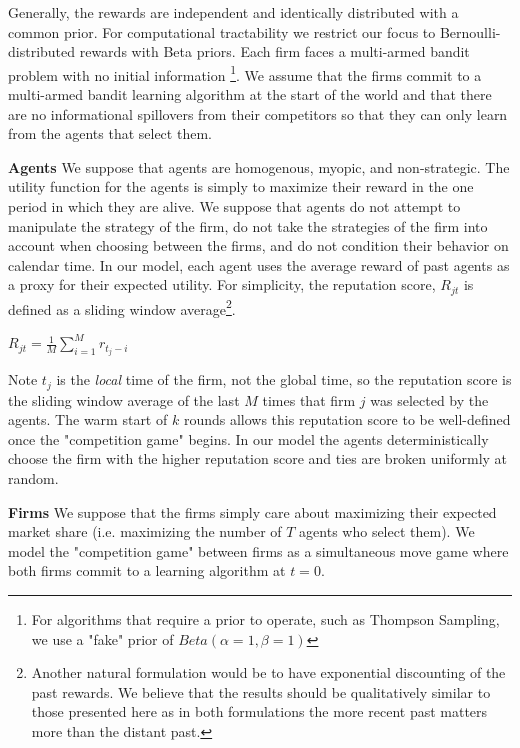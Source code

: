\documentclass[letterpaper]{article}
\theoremstyle{definition}
\begin{document}
Generally, the rewards are independent and identically distributed with a common prior.  For computational tractability we restrict our focus to Bernoulli-distributed rewards with Beta priors. Each firm faces a multi-armed bandit problem with no initial information \footnote{For algorithms that require a prior to operate, such as Thompson Sampling, we use a "fake" prior of $Beta(\alpha=1,\beta=1)$}. We assume that the firms commit to a multi-armed bandit learning algorithm at the start of the world and that there are no informational spillovers from their competitors so that they can only learn from the agents that select them.

\noindent \textbf{Agents} We suppose that agents are homogenous, myopic, and non-strategic. The utility function for the agents is simply to maximize their reward in the one period in which they are alive. We suppose that agents do not attempt to manipulate the strategy of the firm, do not take the strategies of the firm into account when choosing between the firms, and do not condition their behavior on calendar time. In our model, each agent uses the average reward of past agents as a proxy for their expected utility. For simplicity, the reputation score, $R_{jt}$ is defined as a sliding window average\footnote{Another natural formulation would be to have exponential discounting of the past rewards. We believe that the results should be qualitatively similar to those presented here as in both formulations the more recent past matters more than the distant past.}.
\begin{center}
$R_{jt} = \frac{1}{M} \sum\limits_{i=1}^{M} r_{t_j-i}$
\end{center}

Note $t_j$ is the \textit{local} time of the firm, not the global time, so the reputation score is the sliding window average of the last $M$ times that firm $j$ was selected by the agents. The warm start of $k$ rounds allows this reputation score to be well-defined once the "competition game" begins. In our model the agents deterministically choose the firm with the higher reputation score and ties are broken uniformly at random.

\noindent \textbf{Firms} We suppose that the firms simply care about maximizing their expected market share (i.e. maximizing the number of $T$ agents who select them). We model the "competition game" between firms as a simultaneous move game where both firms commit to a learning algorithm at $t = 0$.
\end{document}
